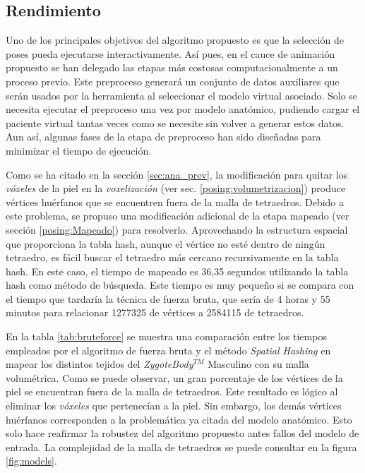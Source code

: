 \clearpage


\subsection{Rendimiento}
\label{sec:rendimiento}

Uno de los principales objetivos del algoritmo propuesto es que la selección de poses pueda ejecutarse interactivamente. Así pues, en el cauce de animación propuesto se han delegado las etapas más costosas computacionalmente a un proceso previo. Este preproceso generará un conjunto de datos auxiliares que serán usados por la herramienta al seleccionar el modelo virtual asociado. Solo se necesita ejecutar el preproceso una vez por modelo anatómico,%
pudiendo cargar el paciente virtual tantas veces como se necesite sin volver a generar estos datos. Aun así, algunas fases de la etapa de preproceso han sido diseñadas para minimizar el tiempo de ejecución.


Como se ha citado en la sección \ref{sec:ana_prev}, la modificación para quitar los \emph{vóxeles} de la piel en la \emph{voxelización} (ver sec. \ref{posing:volumetrizacion}) produce  vértices huérfanos que se encuentren fuera de la malla de tetraedros.
Debido a este problema, se propuso una modificación adicional de la etapa mapeado (ver sección \ref{posing:Mapeado}) para resolverlo. Aprovechando la estructura espacial que proporciona la \ac{tabla hash}, aunque el vértice no esté dentro de ningún tetraedro, es fácil buscar el tetraedro más cercano recursivamente en la \ac{tabla hash}. 
En este caso, el tiempo de mapeado es 36,35 segundos utilizando la \ac{tabla hash} como método de búsqueda. Este tiempo es muy pequeño si se compara con el tiempo que tardaría  la técnica de fuerza bruta, que sería de 4 horas y 55 minutos para relacionar 1277325 de vértices a 2584115 de tetraedros. %



En la tabla \ref{tab:bruteforce} se muestra una comparación entre los tiempos empleados por el algoritmo de fuerza bruta y el método \emph{Spatial Hashing} en mapear los distintos tejidos del \emph{ZygoteBody}$^{TM}$ Masculino con su malla volumétrica. Como se puede observar, un gran porcentaje de los vértices de la piel se encuentran fuera de la malla de tetraedros. Este resultado es lógico al eliminar los \emph{vóxeles} que pertenecían a la piel. Sin embargo, los demás vértices huérfanos corresponden a la problemática ya citada del modelo anatómico. Esto solo hace reafirmar la robustez del algoritmo propuesto antes fallos del modelo de entrada. La complejidad de la malla de tetraedros se puede consultar en la figura \ref{fig:models}. 

